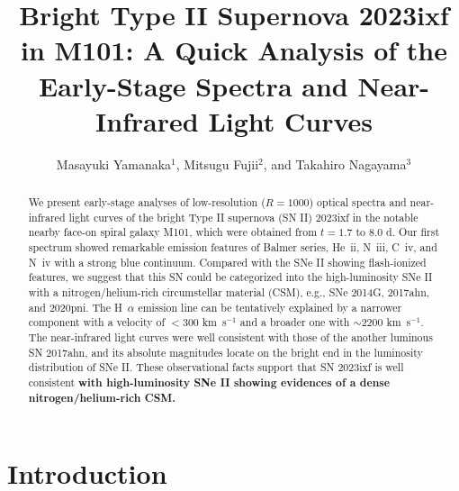 \documentclass{pasj01}
\begin{document}
\title{Bright Type II Supernova 2023ixf in M101: A Quick Analysis of the 
Early-Stage Spectra and Near-Infrared Light Curves}
\author{Masayuki Yamanaka$^{1}$, 
Mitsugu Fujii$^{2}$, and
Takahiro Nagayama$^{3}$}


\maketitle

\begin{abstract}
 We present early-stage analyses of low-resolution ($R=1000$) 
 optical spectra and near-infrared light curves of the bright 
 Type II supernova (SN II) 2023ixf 
 in the notable nearby face-on spiral galaxy M101, 
 which were obtained from $t=1.7$ to $8.0$ d. 
 Our first spectrum 
 showed remarkable emission 
 features of Balmer series, He~{\sc ii}, N~{\sc iii}, C~{\sc iv}, and N~{\sc iv} with a strong blue continuum.
 Compared with the SNe II showing flash-ionized features, we suggest that 
 this SN could be categorized into the high-luminosity SNe II with a nitrogen/helium-rich 
 circumstellar material (CSM), e.g., SNe 2014G, 2017ahn, and 2020pni. 
 The H~{$\alpha$} emission line can be tentatively explained by 
 a narrower component with a velocity of 
 $<300$ km~s$^{-1}$ and a broader one with $\sim2200$ km~s$^{-1}$.
 The near-infrared light curves were well consistent
 with those of the another luminous SN 2017ahn, and
 its absolute magnitudes locate on the bright end
 in the luminosity distribution of SNe II.
 These observational facts support that SN 2023ixf is well consistent {\bf with high-luminosity SNe II showing evidences of a dense nitrogen/helium-rich CSM.} 
\end{abstract}

\section{Introduction}
\end{document}

